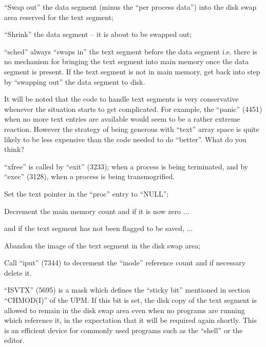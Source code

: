 \item[4467:] ``Swap out'' the data segment
(minus the ``per process data'')
into the disk swap area reserved
for the text segment;

\item[4473:] ``Shrink'' the data segment -- it is
 about to be swapped out;

\item[4475:] ``sched'' always ``swaps in'' the
 text segment before the data segment i.e. there is no mechanism
 for bringing the text segment
 into main memory once the data
 segment is present. If the text
segment is not in main memory,
get back into step by ``swapping
out'' the data segment to disk.
\ed

It will be noted that the code to handle text segments is very conservative
whenever the situation starts to get
complicated. For example, the ``panic''
(4451) when no more text entries are
available would seem to be a rather
extreme reaction. However the strategy
of being generous with ``text'' array
space is quite likely to be less expensive than the code needed to do
``better''. What do you think?



``xfree'' is called by ``exit'' (3233);
when a process is being terminated, and
by ``exec'' (3128), when a process is
being transmogrified.

\bd
\item[4402:] Set the text pointer in the
 ``proc'' entry to ``NULL'';

\item[4403:] Decrement the main memory count
 and if it is now zero ...

\item[4406:] and if the text segment has not
 been flagged to be saved, ...

\item[4408:] Abandon the image of the text
 segment in the disk swap area;

\item[4411:] Call ``iput'' (7344) to decrement
 the ``inode'' reference count and
 if necessary delete it.
\ed


``ISVTX'' (5695) is a mask which defines
the ``sticky bit'' mentioned in section
``CHMOD(I)'' of the UPM. If this bit is
set, the disk copy of the text segment
is allowed to remain in the disk swap
area even when no programs are running
which reference it, in the expectation
that it will be required again shortly.
This is an efficient device for commonly used programs such as the ``shell''
or the editor.
